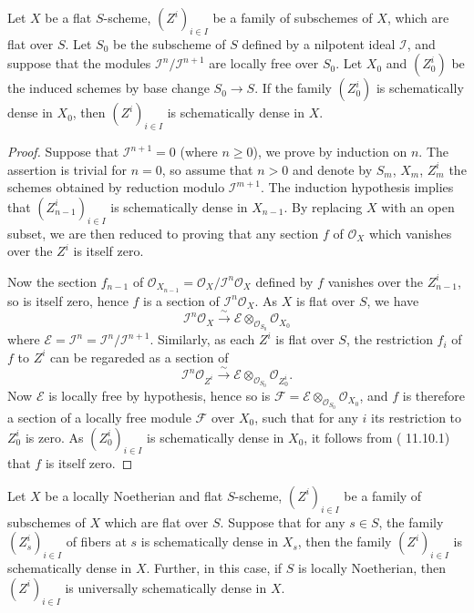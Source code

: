 \begin{lemma}\label{scheme flat schematically dense if nilpotent reduction}
Let $X$ be a flat $S$-scheme, $(Z^i)_{i\in I}$ be a family of subschemes of $X$, which are flat over $S$. Let $S_0$ be the subscheme of $S$ defined by a nilpotent ideal $\mathscr{I}$, and suppose that the modules $\mathscr{I}^n/\mathscr{I}^{n+1}$ are locally free over $S_0$. Let $X_0$ and $(Z_0^i)$ be the induced schemes by base change $S_0\to S$. If the family $(Z^i_0)$ is schematically dense in $X_0$, then $(Z^i)_{i\in I}$ is schematically dense in $X$.
\end{lemma}
\begin{proof}
Suppose that $\mathscr{I}^{n+1}=0$ (where $n\geq 0$), we prove by induction on $n$. The assertion is trivial for $n=0$, so assume that $n>0$ and denote by $S_m$, $X_m$, $Z^i_m$ the schemes obtained by reduction modulo $\mathscr{I}^{m+1}$. The induction hypothesis implies that $(Z^i_{n-1})_{i\in I}$ is schematically dense in $X_{n-1}$. By replacing $X$ with an open subset, we are then reduced to proving that any section $f$ of $\mathscr{O}_X$ which vanishes over the $Z^i$ is itself zero.\par
Now the section $f_{n-1}$ of $\mathscr{O}_{X_{n-1}}=\mathscr{O}_X/\mathscr{I}^n\mathscr{O}_X$ defined by $f$ vanishes over the $Z^i_{n-1}$, so is itself zero, hence $f$ is a section of $\mathscr{I}^n\mathscr{O}_X$. As $X$ is flat over $S$, we have
\[\mathscr{I}^n\mathscr{O}_X\stackrel{\sim}{\to}\mathscr{E}\otimes_{\mathscr{O}_{S_0}}\mathscr{O}_{X_0}\]
where $\mathscr{E}=\mathscr{I}^n=\mathscr{I}^n/\mathscr{I}^{n+1}$. Similarly, as each $Z^i$ is flat over $S$, the restriction $f_i$ of $f$ to $Z^i$ can be regareded as a section of
\[\mathscr{I}^n\mathscr{O}_{Z^i}\stackrel{\sim}{\to}\mathscr{E}\otimes_{\mathscr{O}_{S_0}}\mathscr{O}_{Z_0^i}.\]
Now $\mathscr{E}$ is locally free by hypothesis, hence so is $\mathscr{F}=\mathscr{E}\otimes_{\mathscr{O}_{S_0}}\mathscr{O}_{X_0}$, and $f$ is therefore a section of a locally free module $\mathscr{F}$ over $X_0$, such that for any $i$ its restriction to $Z_0^i$ is zero. As $(Z_0^i)_{i\in I}$ is schematically dense in $X_0$, it follows from (\cite{EGA4-3} 11.10.1) that $f$ is itself zero.
\end{proof}

\begin{lemma}\label{scheme Noe flat schematically dense if fiber is}
Let $X$ be a locally Noetherian and flat $S$-scheme, $(Z^i)_{i\in I}$ be a family of subschemes of $X$ which are flat over $S$. Suppose that for any $s\in S$, the family $(Z^i_s)_{i\in I}$ of fibers at $s$ is schematically dense in $X_s$, then the family $(Z^i)_{i\in I}$ is schematically dense in $X$. Further, in this case, if $S$ is locally Noetherian, then $(Z^i)_{i\in I}$ is universally schematically dense in $X$.
\end{lemma}

